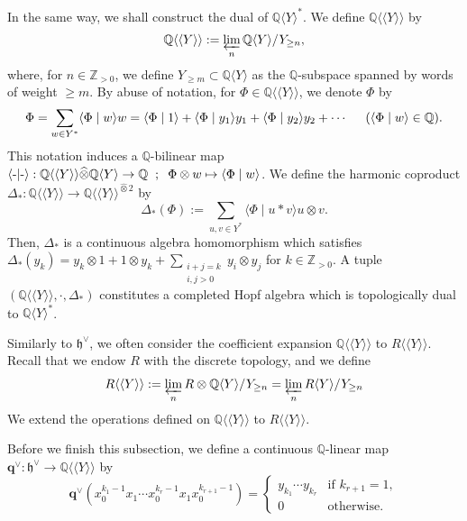 \documentclass[15pt,oneside,reqno]{amsart}
\theoremstyle{remark}{
\newtheorem{lem}[df]{Lemma}
\newtheorem{prop}[df]{Proposition}
\newtheorem{ex}[df]{Example}
\newtheorem{rmk}[df]{Remark}
}
\newcommand{\ide}[1]{\mathfrak{#1}}
\newcommand{\Q}{\mathbb{Q}}
\newcommand{\cotimes}{\widehat{\otimes}}
\begin{document}
In the same way, we shall construct the dual of $\Q\langle Y \rangle^*$.
We define $\Q\langle\langle Y \rangle\rangle$ by
\begin{align*}
\Q\langle\langle Y \rangle\rangle := \varprojlim_{n} \Q\langle Y \rangle / Y_{\ge n},
\end{align*}
where, for $n \in \mathbb{Z}_{>0}$, we define  $Y_{\ge m}\subset \Q\langle Y\rangle$ as the $\Q$-subspace spanned by words of weight $\ge m$.
By abuse of notation, for $\Phi \in \Q\langle\langle Y \rangle\rangle$, we denote $\Phi$ by
\[
\Phi = \sum_{w\in Y^*} \langle \Phi \mid w \rangle w = \langle \Phi \mid 1 \rangle + \langle \Phi \mid y_1 \rangle y_1 + \langle \Phi \mid y_2 \rangle y_2 + \cdots \hspace{0.5cm}( \langle \Phi \mid w \rangle \in \mathbb{Q}).
\]
This notation induces a $\mathbb{Q}$-bilinear map $\langle \mathchar`- | \mathchar`- \rangle : \Q\langle\langle Y \rangle\rangle \cotimes \Q\langle Y \rangle \rightarrow \mathbb{Q} \hspace{0.2cm} ; \hspace{0.2cm}  \Phi \otimes w \mapsto \langle \Phi \mid w \rangle$.
We define the harmonic coproduct $\Delta_{*} : \Q\langle\langle Y \rangle\rangle \rightarrow  \Q\langle\langle Y \rangle\rangle^{\cotimes 2}$ by
\[
\Delta_{*}(\Phi) := \sum_{u,v\in Y^*} \langle \Phi \mid u* v \rangle u\otimes v. 
\]
Then, $\Delta_{*}$ is a continuous algebra homomorphism which satisfies $\Delta_{*}(y_k) = y_k \otimes 1 + 1\otimes y_k + \sum_{\substack{i + j = k \\ i,j>0}} y_i \otimes y_j$ for $k\in\mathbb{Z}_{>0}$.
A tuple $(\Q\langle\langle Y \rangle\rangle, \cdot, \Delta_{*})$ constitutes a completed Hopf algebra which is topologically dual to $\Q\langle  Y \rangle^*$.

Similarly to $\ide{h}^{\vee}$, we often consider the coefficient expansion $\Q\langle \langle Y \rangle \rangle$ to $R\langle \langle Y \rangle \rangle$.
Recall that we endow $R$ with the discrete topology, and we define
\begin{align*}
R\langle \langle Y \rangle \rangle := \varprojlim_{n} R\otimes \Q\langle Y \rangle / Y_{\ge n} = \varprojlim_{n} R \langle Y \rangle / Y_{\ge n}
\end{align*}
We extend the operations defined on $\Q \langle \langle Y \rangle \rangle$ to $R \langle \langle Y \rangle \rangle$.


Before we finish this subsection, we define a continuous $\Q$-linear map $\mathbf{q}^{\vee} : \ide{h}^{\vee} \rightarrow\Q\langle\langle Y \rangle\rangle$ by
\[
\mathbf{q}^{\vee}(x_0^{k_1-1}x_1\cdots x_0^{k_r-1}x_1x_0^{k_{r+1}-1}) 
=
\begin{cases}
y_{k_1}\cdots y_{k_r}& \text{if } k_{r+1}=1, \\
0& \text{otherwise.}
\end{cases}
\]
\end{document}
